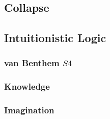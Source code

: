 \documentclass[11pt]{article}
\numberwithin{equation}{subsection}
\begin{document}
\subsection{Collapse}\label{collapse}

\subsection{Intuitionistic Logic}\label{intuitionism}

\subsubsection{van Benthem $S4$}
\subsubsection{Knowledge}
\subsubsection{Imagination}

\end{document}
